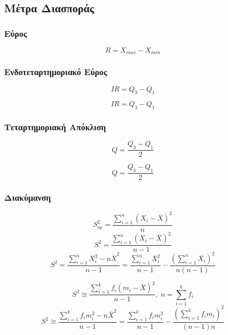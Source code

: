 \subsection*{Μέτρα Διασποράς}

\subsubsection*{Εύρος}
\begin{multicols}{2}
  \[
  R=X_{max}-X_{min}
  \]
\end{multicols}


\subsubsection*{Ενδοτεταρτημοριακό Εύρος}
\begin{multicols}{2}
  \[
  IR=Q_{3}-Q_{1}
  \]

  \[
  IR=Q_{3}-Q_{1}
  \]
\end{multicols}


\subsubsection*{Τεταρτημοριακή Απόκλιση}

\begin{multicols}{2}
  \[
  Q=\frac{Q_{3}-Q_{1}}{2}
  \]

  \[
  Q=\frac{Q_{3}-Q_{1}}{2}
  \]

\end{multicols}

\subsubsection*{Διακύμανση}

\begin{multicols}{2}
  \[
S_{\text{ορ}}^2=\frac{\sum_{i=1}^{n}(X_{i}-\overline{X})^{2}}{n}
  \]
  \[
S^{2}=\frac{\sum_{i=1}^{n}(X_{i}-\overline{X})^{2}}{n-1}
  \]
  \[
S^{2}=\frac{\sum_{i=1}^{n}X_{i}^{2}-n\overline{X}^{2}}{n-1}=\frac{\sum_{i=1}^{n}X_{i}^{2}}{n-1}-\frac{(\sum_{i=1}^{n}X_{i})^{2}}{n(n-1)}
  \]

  \columnbreak

\[
S^{2}\cong \frac{\sum_{i=1}^{k}f_{i}(m_{i}-\overline{X})^{2}}{n-1},\; n=\sum_{i=1}^{k}f_{i}
\]
\[
S^{2}\cong \frac{\sum_{i=1}^{k}f_{i}m_{i}^{2}-n\overline{X}^{2}}{n-1}=\frac{\sum_{i=1}^{k}f_{i}m_{i}^{2}}{n-1}-\frac{(\sum_{i=1}^{k}f_{i}m_{i})^{2}}{(n-1)n}
\]

\end{multicols}

